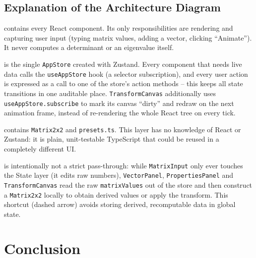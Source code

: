 \documentclass[11pt,a4paper]{article}
\begin{document}
\subsection{Explanation of the Architecture Diagram}

\begin{description}[leftmargin=1.4em, style=nextline]
  \item[Presentation Layer] contains every React component. Its only
    responsibilities are rendering and capturing user input (typing matrix
    values, adding a vector, clicking ``Animate''). It never computes a
    determinant or an eigenvalue itself.

  \item[State-Management Layer] is the single \texttt{AppStore} created with
    Zustand. Every component that needs live data calls the
    \texttt{useAppStore} hook (a selector subscription), and every user action
    is expressed as a call to one of the store's action methods -- this keeps
    all state transitions in one auditable place. \texttt{TransformCanvas}
    additionally uses \texttt{useAppStore.subscribe} to mark its canvas
    ``dirty'' and redraw on the next animation frame, instead of re-rendering
    the whole React tree on every tick.

  \item[Domain / Business-Logic Layer] contains \texttt{Matrix2x2} and
    \texttt{presets.ts}. This layer has no knowledge of React or Zustand: it is
    plain, unit-testable TypeScript that could be reused in a completely
    different UI.

  \item[Layer communication] is intentionally not a strict pass-through: while
    \texttt{MatrixInput} only ever touches the State layer (it edits raw
    numbers), \texttt{VectorPanel}, \texttt{PropertiesPanel} and
    \texttt{TransformCanvas} read the raw \texttt{matrixValues} out of the
    store and then construct a \texttt{Matrix2x2} locally to obtain derived
    values or apply the transform. This shortcut (dashed arrow) avoids storing
    derived, recomputable data in global state.
\end{description}

\section{Conclusion}
\end{document}
